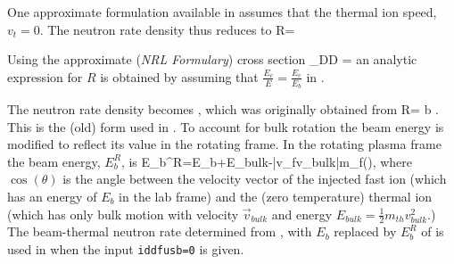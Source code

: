One approximate formulation available in \ot assumes that the thermal ion speed,
$v_t=0$. The neutron rate density thus reduces to
\beq
 R=
 \int{} \label{eq:11}
\eeq

Using the approximate (\emph{NRL Formulary}) cross section
\beq
 \sigma_{DD} = \label{eq:12b}
\eeq
an analytic expression for $R$ is obtained by assuming that
$\frac{E_c}{E}=\frac{E_c}{E_b}$ in . 

The neutron rate density becomes , which was originally obtained
from \cite{Scott}
\beq
 R=
 {b} \label{eq:11a}.
\eeq
This is the (old) form used in \ot. To account for bulk  rotation the beam
energy is modified to reflect its value in the rotating frame. In the rotating
plasma frame the beam energy, $E_b^R$, is
\beq
 E_b^R=E_b+E_{bulk}-|v_fv_{bulk}|m_f\cos(\theta)\label{eq:12},
\eeq
where $\cos(\theta) $ is the angle between the velocity vector of the
injected fast ion (which has an energy of $E_b$ in the lab frame)
and the (zero temperature) thermal ion (which has only bulk motion 
with velocity $\vec{v}_{bulk}$ and energy $E_{bulk}=
\frac{1}{2}m_{th}v_{bulk}^2$.) The beam-thermal neutron rate
determined from , with $E_b$ replaced by $E_b^R $ of  is used in \ot when the input  \texttt{iddfusb=0} is given.

